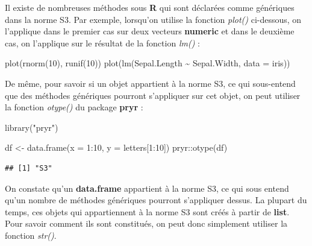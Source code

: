 \documentclass[
]{book}
\newenvironment{Shaded}{\begin{snugshade}}{\end{snugshade}}
\newcommand{\AttributeTok}[1]{\textcolor[rgb]{0.77,0.63,0.00}{#1}}
\newcommand{\DecValTok}[1]{\textcolor[rgb]{0.00,0.00,0.81}{#1}}
\newcommand{\FunctionTok}[1]{\textcolor[rgb]{0.00,0.00,0.00}{#1}}
\newcommand{\NormalTok}[1]{#1}
\newcommand{\OtherTok}[1]{\textcolor[rgb]{0.56,0.35,0.01}{#1}}
\newcommand{\SpecialCharTok}[1]{\textcolor[rgb]{0.00,0.00,0.00}{#1}}
\newcommand{\StringTok}[1]{\textcolor[rgb]{0.31,0.60,0.02}{#1}}
\theoremstyle{definition}
\theoremstyle{definition}
\theoremstyle{definition}
\theoremstyle{definition}
\theoremstyle{remark}
\begin{document}
Il existe de nombreuses méthodes sous \textbf{R} qui sont déclarées comme génériques dans la norme S3. Par exemple, lorsqu'on utilise la fonction \emph{plot()} ci-dessous, on l'applique dans le premier cas sur deux vecteurs \textbf{numeric} et dans le deuxième cas, on l'applique sur le résultat de la fonction \emph{lm()} :

\begin{Shaded}
\begin{Highlighting}[]
\FunctionTok{plot}\NormalTok{(}\FunctionTok{rnorm}\NormalTok{(}\DecValTok{10}\NormalTok{), }\FunctionTok{runif}\NormalTok{(}\DecValTok{10}\NormalTok{))}
\FunctionTok{plot}\NormalTok{(}\FunctionTok{lm}\NormalTok{(Sepal.Length }\SpecialCharTok{\textasciitilde{}}\NormalTok{ Sepal.Width, }\AttributeTok{data =}\NormalTok{ iris))}
\end{Highlighting}
\end{Shaded}

De même, pour savoir si un objet appartient à la norme S3, ce qui sous-entend que des méthodes génériques pourront s'appliquer sur cet objet, on peut utiliser la fonction \emph{otype()} du package \textbf{pryr} :

\begin{Shaded}
\begin{Highlighting}[]
\FunctionTok{library}\NormalTok{(}\StringTok{"pryr"}\NormalTok{)}
\end{Highlighting}
\end{Shaded}

\begin{Shaded}
\begin{Highlighting}[]
\NormalTok{df }\OtherTok{\textless{}{-}} \FunctionTok{data.frame}\NormalTok{(}\AttributeTok{x =} \DecValTok{1}\SpecialCharTok{:}\DecValTok{10}\NormalTok{, }\AttributeTok{y =}\NormalTok{ letters[}\DecValTok{1}\SpecialCharTok{:}\DecValTok{10}\NormalTok{])}
\NormalTok{pryr}\SpecialCharTok{::}\FunctionTok{otype}\NormalTok{(df)    }
\end{Highlighting}
\end{Shaded}

\begin{verbatim}
## [1] "S3"
\end{verbatim}

On constate qu'un \textbf{data.frame} appartient à la norme S3, ce qui sous entend qu'un nombre de méthodes génériques pourront s'appliquer dessus. La plupart du temps, ces objets qui appartiennent à la norme S3 sont créés à partir de \textbf{list}. Pour savoir comment ils sont constitués, on peut donc simplement utiliser la fonction \emph{str()}.
\end{document}
